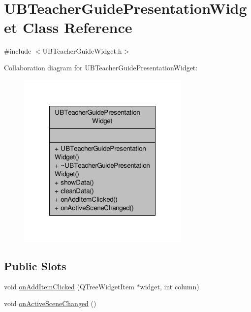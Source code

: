 \hypertarget{class_u_b_teacher_guide_presentation_widget}{\section{U\-B\-Teacher\-Guide\-Presentation\-Widget Class Reference}
\label{d2/d4d/class_u_b_teacher_guide_presentation_widget}
}


{\ttfamily \#include $<$U\-B\-Teacher\-Guide\-Widget.\-h$>$}



Collaboration diagram for U\-B\-Teacher\-Guide\-Presentation\-Widget\-:
\nopagebreak
\begin{figure}[H]
\begin{center}
\leavevmode
\includegraphics[width=240pt]{d2/d89/class_u_b_teacher_guide_presentation_widget__coll__graph}
\end{center}
\end{figure}
\subsection*{Public Slots}
\begin{DoxyCompactItemize}
\item 
void \hyperlink{class_u_b_teacher_guide_presentation_widget_ae6971abdc6a6f9406ab0eddf32795a45}{on\-Add\-Item\-Clicked} (Q\-Tree\-Widget\-Item $\ast$widget, int column)
\item 
void \hyperlink{class_u_b_teacher_guide_presentation_widget_aba3adb78f4a8c846bba124ce0e8a5ed2}{on\-Active\-Scene\-Changed} ()
\end{DoxyCompactItemize}
